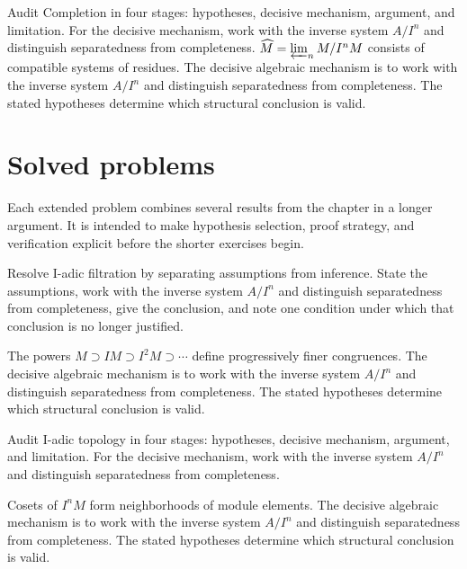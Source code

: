 \begin{example}\label{ex:v18-worked-04}
Audit Completion in four stages: hypotheses, decisive mechanism, argument, and limitation. For the decisive mechanism, work with the inverse system \(A/I^n\) and distinguish separatedness from completeness. $\widehat M=\varprojlim_n M/I^nM$ consists of compatible systems of residues. The decisive algebraic mechanism is to work with the inverse system \(A/I^n\) and distinguish separatedness from completeness. The stated hypotheses determine which structural conclusion is valid.
\end{example}

\section{Solved problems}
Each extended problem combines several results from the chapter in a longer argument. It is intended to make hypothesis selection, proof strategy, and verification explicit before the shorter exercises begin.

\begin{problem}\label{prob:v18-problem-01}
Resolve I-adic filtration by separating assumptions from inference. State the assumptions, work with the inverse system \(A/I^n\) and distinguish separatedness from completeness, give the conclusion, and note one condition under which that conclusion is no longer justified.
\end{problem}
\begin{solution}
The powers $M\supset IM\supset I^2M\supset\cdots$ define progressively finer congruences. The decisive algebraic mechanism is to work with the inverse system \(A/I^n\) and distinguish separatedness from completeness. The stated hypotheses determine which structural conclusion is valid.
\end{solution}

\begin{problem}\label{prob:v18-problem-02}
Audit I-adic topology in four stages: hypotheses, decisive mechanism, argument, and limitation. For the decisive mechanism, work with the inverse system \(A/I^n\) and distinguish separatedness from completeness.
\end{problem}
\begin{solution}
Cosets of $I^nM$ form neighborhoods of module elements. The decisive algebraic mechanism is to work with the inverse system \(A/I^n\) and distinguish separatedness from completeness. The stated hypotheses determine which structural conclusion is valid.
\end{solution}

